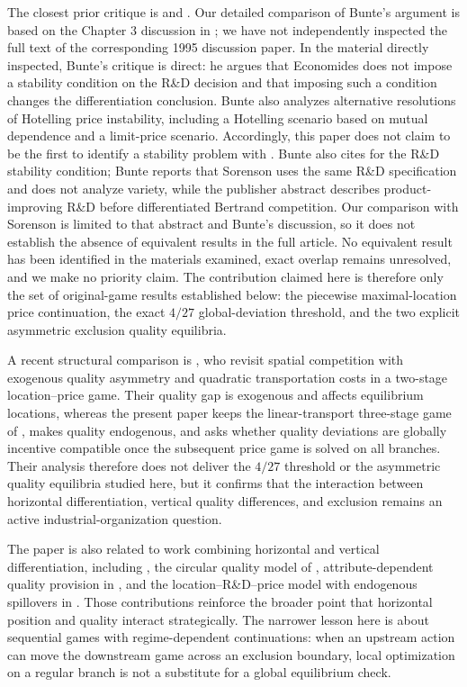 The closest prior critique is \citet{Bunte1995} and \citet{Bunte1997}. Our detailed comparison of Bunte's argument is based on the Chapter 3 discussion in \citet{Bunte1997}; we have not independently inspected the full text of the corresponding 1995 discussion paper. In the material directly inspected, Bunte's critique is direct: he argues that Economides does not impose a stability condition on the R\&D decision and that imposing such a condition changes the differentiation conclusion. Bunte also analyzes alternative resolutions of Hotelling price instability, including a Hotelling scenario based on mutual dependence and a limit-price scenario. Accordingly, this paper does not claim to be the first to identify a stability problem with \citet{Economides1989}. Bunte also cites \citet{Sorenson1995} for the R\&D stability condition; Bunte reports that Sorenson uses the same R\&D specification and does not analyze variety, while the publisher abstract describes product-improving R\&D before differentiated Bertrand competition. Our comparison with Sorenson is limited to that abstract and Bunte's discussion, so it does not establish the absence of equivalent results in the full article. No equivalent result has been identified in the materials examined, exact overlap remains unresolved, and we make no priority claim. The contribution claimed here is therefore only the set of original-game results established below: the piecewise maximal-location price continuation, the exact $4/27$ global-deviation threshold, and the two explicit asymmetric exclusion quality equilibria.

A recent structural comparison is \citet{CohenHeifetz2024}, who revisit spatial competition with exogenous quality asymmetry and quadratic transportation costs in a two-stage location--price game. Their quality gap is exogenous and affects equilibrium locations, whereas the present paper keeps the linear-transport three-stage game of \citet{Economides1989}, makes quality endogenous, and asks whether quality deviations are globally incentive compatible once the subsequent price game is solved on all branches. Their analysis therefore does not deliver the $4/27$ threshold or the asymmetric quality equilibria studied here, but it confirms that the interaction between horizontal differentiation, vertical quality differences, and exclusion remains an active industrial-organization question.

The paper is also related to work combining horizontal and vertical differentiation, including \citet{NevenThisse1990}, the circular quality model of \citet{Economides1993}, attribute-dependent quality provision in \citet{DegryseIrmen2001}, and the location--R\&D--price model with endogenous spillovers in \citet{PigaPoyagoTheotoky2005}. Those contributions reinforce the broader point that horizontal position and quality interact strategically. The narrower lesson here is about sequential games with regime-dependent continuations: when an upstream action can move the downstream game across an exclusion boundary, local optimization on a regular branch is not a substitute for a global equilibrium check.

